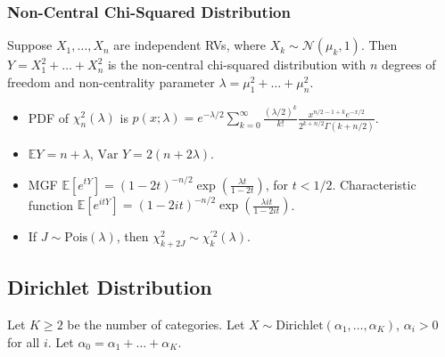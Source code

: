 \documentclass[twoside]{article}
\newcommand\bbE{\mathbb{E}}
\newcommand\calN{\mathcal{N}}
\newcommand\lmb{\lambda}
\newcommand\var{\text{Var }}
\begin{document}
\subsubsection{Non-Central Chi-Squared Distribution}
Suppose $X_1, \dots, X_n$ are independent RVs, where $X_k \sim \calN(\mu_k, 1)$. Then $Y = X_1^2 + \dots + X_n^2$ is the non-central chi-squared distribution with $n$ degrees of freedom and non-centrality parameter $\lmb = \mu_1^2 + \dots + \mu_n^2$.

\begin{itemize}
\item PDF of $\chi_n^2(\lmb)$ is $p(x; \lmb) = e^{-\lmb/2} \displaystyle\sum_{k=0}^\infty \displaystyle\frac{(\lmb/2)^k}{k!}\frac{x^{n/2 - 1 + k}e^{-x/2}}{2^{k + n/2} \Gamma(k + n/2)}$.
\item $\bbE  Y = n + \lmb$, $\var Y = 2(n + 2\lmb)$.

\item MGF $\bbE [e^{tY}] = (1-2t)^{-n/2} \exp \left( \displaystyle\frac{\lmb t}{1 - 2t} \right)$, for $t < 1/2$. Characteristic function $\bbE [e^{itY}] = (1-2it)^{-n/2} \exp \left( \displaystyle\frac{\lmb it}{1 - 2it} \right)$.

\item If $J \sim \text{Pois}(\lmb)$, then $\chi_{k + 2J}^2 \sim \chi_k^{\prime 2}(\lmb)$.
\end{itemize}

\subsection{Dirichlet Distribution}
Let $K \geq 2$ be the number of categories. Let $X \sim \text{Dirichlet}(\alpha_1, \dots, \alpha_K)$, $\alpha_i > 0$ for all $i$. Let $\alpha_0 = \alpha_1 + \dots + \alpha_K$.
\end{document}

